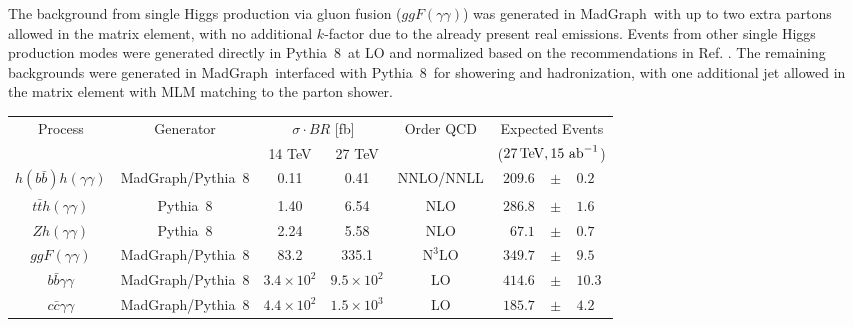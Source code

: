 The background from single Higgs production via gluon fusion ($ggF(\gamma\gamma)$) was generated in {\sc\small MadGraph}\ with up to two extra partons allowed in the matrix element, with no additional $k$-factor due to the already present real emissions. Events from other single Higgs production modes were generated directly in {\sc\small Pythia~8}\ at LO and normalized based on the recommendations in Ref. \cite{deFlorian:2016spz}. The remaining backgrounds were generated in {\sc\small MadGraph}\ interfaced with {\sc\small Pythia~8}\ for showering and hadronization, with one additional jet allowed in the matrix element with MLM matching \cite{Mangano:2006rw, Alwall:2007fs} to the parton shower.

\begingroup
\renewcommand*{\arraystretch}{.7}
\begin{table}
\centering
\begin{tabular}{|c|c|cc|c|rcl|}
\hline
\multirow{2}{*}{Process}     & \multirow{2}{*}{Generator} & \multicolumn{2}{c|}{$\sigma \cdot BR$ {[}fb{]}} & \multirow{2}{*}{Order QCD} & \multicolumn{3}{c|}{Expected Events} \\
                              			&                   							& 14 TeV  			& 27 TeV  			&		& \multicolumn{3}{c|}{($27\, {\rm TeV}, 15~\text{ab}^{-1}$)} \\ \hline
$h(b\bar{b})h(\gamma\gamma)$  	& {\sc\small MadGraph}/{\sc\small Pythia~8} 	& 0.11      			& 0.41      			& NNLO/NNLL								& $209.6$		& $\pm$ & $0.2$ \\ \hline
$t\bar{t}h(\gamma\gamma)$     		& {\sc\small Pythia~8}           			& 1.40      			& 6.54      			& NLO  										& $286.8$		& $\pm$ & $1.6$\\
$Zh(\gamma\gamma)$            		& {\sc\small Pythia~8}           			& 2.24      			& 5.58      			& NLO 											& $67.1$ 		& $\pm$ & $0.7$ \\
$ggF(\gamma\gamma)$           		& {\sc\small MadGraph}/{\sc\small Pythia~8} 	& 83.2      			& 335.1     		& $\text{N}^{3}\text{LO}$ 				& $349.7$ 	& $\pm$ & $9.5$ \\ \hline
$b\bar{b}\gamma\gamma$        	& {\sc\small MadGraph}/{\sc\small Pythia~8} 	& $3.4\times 10^{2}$     & $9.5\times 10^{2}$     & LO 					& $414.6$ 	& $\pm$ & $10.3$ \\
$c\bar{c}\gamma\gamma$        		& {\sc\small MadGraph}/{\sc\small Pythia~8} 	& $4.4\times 10^{2}$     & $1.5\times 10^{3}$     & LO 					& $185.7$ 	& $\pm$ & $4.2$ \\

\end{tabular}
\end{table}
